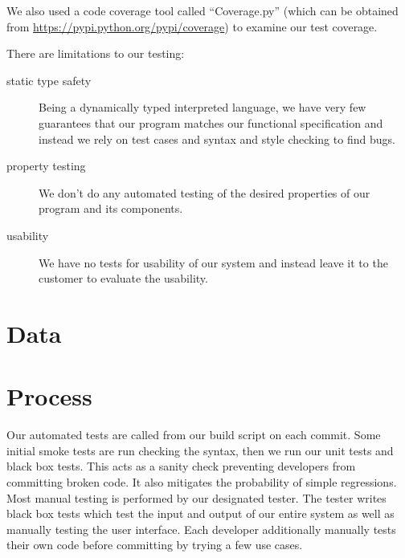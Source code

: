 \documentclass{article}
\begin{document}
We also used a code coverage tool called ``Coverage.py'' (which can be obtained from \url{https://pypi.python.org/pypi/coverage}) to examine our test coverage.

There are limitations to our testing:
\begin{description}
  \item[static type safety] Being a dynamically typed interpreted language, we have very few guarantees that our program matches our functional specification and instead we rely on test cases and syntax and style checking to find bugs.
  \item[property testing] We don't do any automated testing of the desired properties of our program and its components.
  \item[usability] We have no tests for usability of our system and instead leave it to the customer to evaluate the usability.
\end{description}

\section{Data}


\section{Process}


Our automated tests are called from our build script on each commit. Some initial smoke tests are run checking the syntax, then we run our unit tests and black box tests. This acts as a sanity check preventing developers from committing broken code. It also mitigates the probability of simple regressions. Most manual testing is performed by our designated tester. The tester writes black box tests which test the input and output of our entire system as well as manually testing the user interface. Each developer additionally manually tests their own code before committing by trying a few use cases.
\end{document}
